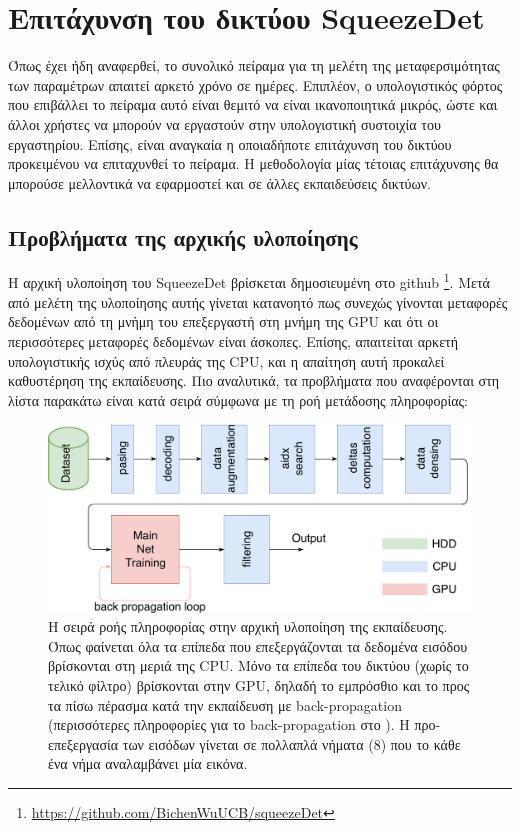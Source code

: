 \chapter{Επιτάχυνση του δικτύου SqueezeDet}
\label{chapter:accel_SqueezeDet}
Όπως έχει ήδη αναφερθεί, το συνολικό πείραμα για τη μελέτη της μεταφερσιμότητας των παραμέτρων απαιτεί αρκετό χρόνο σε ημέρες. Επιπλέον, ο υπολογιστικός φόρτος που επιβάλλει το πείραμα αυτό είναι θεμιτό να είναι ικανοποιητικά μικρός, ώστε και άλλοι χρήστες να μπορούν να εργαστούν στην υπολογιστική συστοιχία του εργαστηρίου. Επίσης, είναι αναγκαία η οποιαδήποτε επιτάχυνση του δικτύου προκειμένου να επιταχυνθεί το πείραμα. Η μεθοδολογία μίας τέτοιας επιτάχυνσης θα μπορούσε μελλοντικά να εφαρμοστεί και σε άλλες εκπαιδεύσεις δικτύων.

\section{Προβλήματα της αρχικής υλοποίησης}
\label{section:oldProblems}
Η αρχική υλοποίηση του SqueezeDet βρίσκεται δημοσιευμένη στο github \footnote{\url{https://github.com/BichenWuUCB/squeezeDet}}. Μετά από μελέτη της υλοποίησης αυτής γίνεται κατανοητό πως συνεχώς γίνονται μεταφορές δεδομένων από τη μνήμη του επεξεργαστή στη μνήμη της GPU και ότι οι περισσότερες μεταφορές δεδομένων είναι άσκοπες. Επίσης, απαιτείται αρκετή υπολογιστικής ισχύς από πλευράς της CPU, και η απαίτηση αυτή προκαλεί καθυστέρηση της εκπαίδευσης. Πιο αναλυτικά, τα προβλήματα που αναφέρονται στη λίστα παρακάτω είναι κατά σειρά σύμφωνα με τη ροή μετάδοσης πληροφορίας:

\begin{figure}
\centering
\includegraphics[width = \textwidth]{figures/experiments/old_pipeline.pdf}
\caption[Η σειρά ροής πληροφορίας στην αρχική υλοποίηση της εκπαίδευσης]{Η σειρά ροής πληροφορίας στην αρχική υλοποίηση της εκπαίδευσης. Όπως φαίνεται όλα τα επίπεδα που επεξεργάζονται τα δεδομένα εισόδου βρίσκονται στη μεριά της CPU. Μόνο τα επίπεδα του δικτύου (χωρίς το τελικό φίλτρο) βρίσκονται στην GPU, δηλαδή το εμπρόσθιο και το προς τα πίσω πέρασμα κατά την εκπαίδευση με back-propagation (περισσότερες πληροφορίες για το back-propagation στο \cite{66}). Η προ-επεξεργασία των εισόδων γίνεται σε πολλαπλά νήματα (8) που το κάθε ένα νήμα αναλαμβάνει μία εικόνα.}
\label{fig:old_pipeline}
\end{figure}




